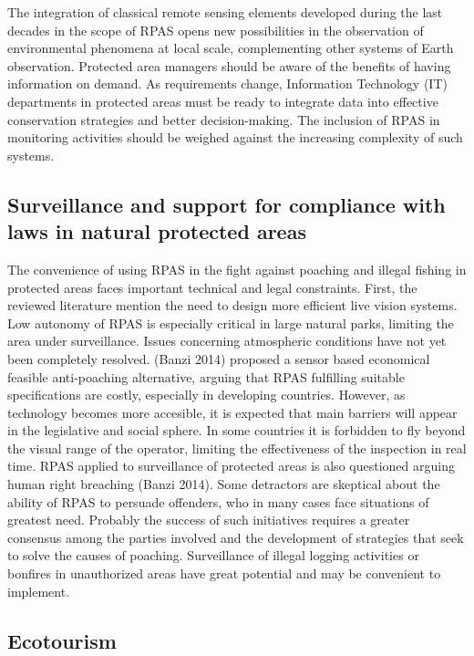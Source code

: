 \documentclass[]{interact}
\theoremstyle{plain}%
\theoremstyle{definition}
\theoremstyle{remark}
\begin{document}
The integration of classical remote sensing elements developed during
the last decades in the scope of RPAS opens new possibilities in the
observation of environmental phenomena at local scale, complementing
other systems of Earth observation. Protected area managers should be
aware of the benefits of having information on demand. As requirements
change, Information Technology (IT) departments in protected areas must
be ready to integrate data into effective conservation strategies and
better decision-making. The inclusion of RPAS in monitoring activities
should be weighed against the increasing complexity of such systems.

\subsection{Surveillance and support for compliance with laws in natural
protected
areas}\label{surveillance-and-support-for-compliance-with-laws-in-natural-protected-areas}

The convenience of using RPAS in the fight against poaching and illegal
fishing in protected areas faces important technical and legal
constraints. First, the reviewed literature mention the need to design
more efficient live vision systems. Low autonomy of RPAS is especially
critical in large natural parks, limiting the area under surveillance.
Issues concerning atmospheric conditions have not yet been completely
resolved. (Banzi 2014) proposed a sensor based economical feasible
anti-poaching alternative, arguing that RPAS fulfilling suitable
specifications are costly, especially in developing countries. However,
as technology becomes more accesible, it is expected that main barriers
will appear in the legislative and social sphere. In some countries it
is forbidden to fly beyond the visual range of the operator, limiting
the effectiveness of the inspection in real time. RPAS applied to
surveillance of protected areas is also questioned arguing human right
breaching (Banzi 2014). Some detractors are skeptical about the ability
of RPAS to persuade offenders, who in many cases face situations of
greatest need. Probably the success of such initiatives requires a
greater consensus among the parties involved and the development of
strategies that seek to solve the causes of poaching. Surveillance of
illegal logging activities or bonfires in unauthorized areas have great
potential and may be convenient to implement.

\subsection{Ecotourism}\label{ecotourism-1}
\end{document}
